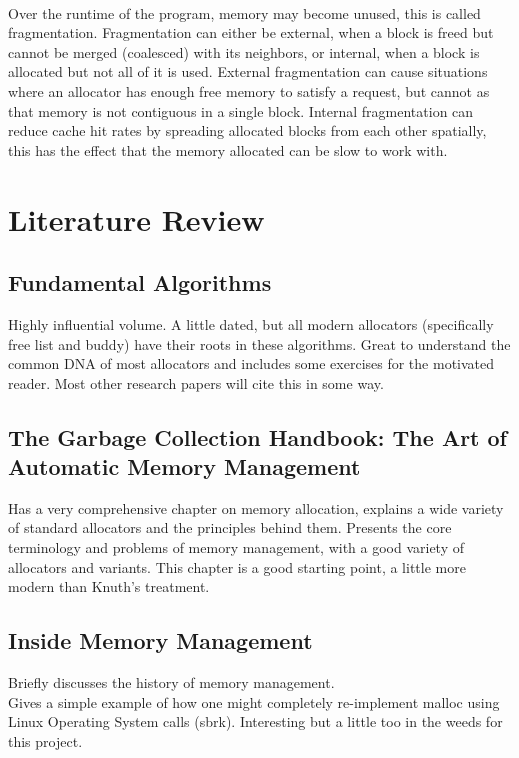 \documentclass{report}
\begin{document}
\\
Over the runtime of the program, memory may become unused, this is called fragmentation. Fragmentation can either be external, when a block is freed but cannot be merged (coalesced) with its neighbors, or internal, when a block is allocated but not all of it is used. External fragmentation can cause situations where an allocator has enough free memory to satisfy a request, but cannot as that memory is not contiguous in a single block. Internal fragmentation can reduce cache hit rates by spreading allocated blocks from each other spatially, this has the effect that the memory allocated can be slow to work with.


\chapter{Literature Review}

\section[Knuth]{Fundamental Algorithms}
Highly influential volume. A little dated, but all modern allocators (specifically free list and buddy) have their roots in these algorithms. Great to understand the common DNA of most allocators and includes some exercises for the motivated reader. Most other research papers will cite this in some way. \cite{knuth97}

\section[GC Handbook]{The Garbage Collection Handbook: The Art of Automatic Memory Management}
Has a very comprehensive chapter on memory allocation, explains a wide variety of standard allocators and the principles behind them. Presents the core terminology and problems of memory management, with a good variety of allocators and variants. This chapter is a good starting point, a little more modern than Knuth's treatment. \cite{10.5555/2025255}

\section[IBM Tutorial]{Inside Memory Management}
Briefly discusses the history of memory management.\\
Gives a simple example of how one might completely re-implement malloc using Linux Operating System calls (sbrk). Interesting but a little too in the weeds for this project. \cite{ibmDeveloper}
\end{document}
